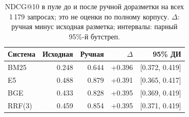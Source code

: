 \begin{table}[t]
\caption{NDCG@10 в пуле до и после ручной доразметки на всех 1\,179 запросах; это не оценки по полному корпусу. $\Delta$: ручная минус исходная разметка; интервалы: парный 95\%-й бутстреп.}
\label{tab:manual-results}
\centering\small
\begin{tabularx}{\textwidth}{@{}Lrrrr@{}}
\toprule
Система & Исходная & Ручная & $\Delta$ & 95\% ДИ \\
\midrule
BM25 & 0.248 & 0.644 & +0.396 & [0.372, 0.419] \\
E5 & 0.488 & 0.879 & +0.391 & [0.365, 0.417] \\
BGE & 0.433 & 0.828 & +0.395 & [0.369, 0.419] \\
RRF(3) & 0.459 & 0.854 & +0.395 & [0.371, 0.419] \\
\bottomrule
\end{tabularx}
\end{table}
